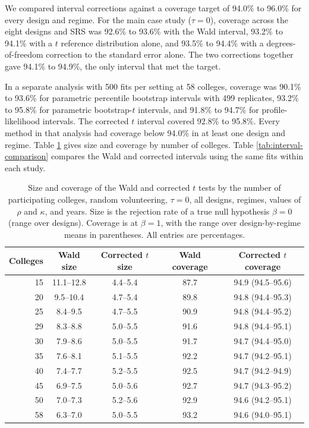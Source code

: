 \documentclass[11pt]{article}
\begin{document}
We compared interval corrections against a coverage target of 94.0\%
to 96.0\% for every design and regime. For the main case study
($\tau=0$), coverage across the eight designs and SRS was 92.6\% to
93.6\% with the Wald interval, 93.2\% to 94.1\% with a $t$ reference
distribution alone, and 93.5\% to 94.4\% with a degrees-of-freedom
correction to the standard error alone. The two corrections together
gave 94.1\% to 94.9\%, the only interval that met the target.

In a separate analysis with 500 fits per setting at 58 colleges, coverage
was 90.1\% to 93.6\% for parametric percentile bootstrap intervals
with 499 replicates, 93.2\% to 95.8\% for parametric bootstrap-$t$
intervals, and 91.8\% to 94.7\% for profile-likelihood intervals. The
corrected $t$ interval covered 92.8\% to 95.8\%. Every method in that
analysis had coverage below 94.0\% in at least one design and regime.
Table \ref{tab:nc-calibration} gives size and coverage by number of
colleges. Table \ref{tab:interval-comparison} compares the Wald and
corrected intervals using the same fits within each study.

\begin{table}[!htb]
\small
\centering
\caption{Size and coverage of the Wald and corrected $t$ tests by the number of participating colleges, random volunteering, $\tau = 0$, all designs, regimes, values of $\rho$ and $\kappa$, and years. Size is the rejection rate of a true null hypothesis $\beta = 0$ (range over designs). Coverage is at $\beta = 1$, with the range over design-by-regime means in parentheses. All entries are percentages.}
\label{tab:nc-calibration}
\begin{tabular}{rcccc}
\toprule
Colleges & Wald size & Corrected $t$ size & Wald coverage & Corrected $t$ coverage \\
\midrule
15 & 11.1--12.8 & 4.4--5.4 & 87.7 & 94.9 (94.5--95.6) \\
20 & 9.5--10.4 & 4.7--5.4 & 89.8 & 94.8 (94.4--95.3) \\
25 & 8.4--9.5 & 4.7--5.5 & 90.9 & 94.8 (94.4--95.2) \\
29 & 8.3--8.8 & 5.0--5.5 & 91.6 & 94.8 (94.4--95.1) \\
30 & 7.9--8.6 & 5.0--5.5 & 91.7 & 94.7 (94.4--95.0) \\
35 & 7.6--8.1 & 5.1--5.5 & 92.2 & 94.7 (94.2--95.1) \\
40 & 7.4--7.7 & 5.2--5.5 & 92.5 & 94.7 (94.2--94.9) \\
45 & 6.9--7.5 & 5.0--5.6 & 92.7 & 94.7 (94.3--95.2) \\
50 & 7.0--7.3 & 5.2--5.6 & 92.9 & 94.6 (94.2--95.1) \\
58 & 6.3--7.0 & 5.0--5.5 & 93.2 & 94.6 (94.0--95.1) \\
\bottomrule
\end{tabular}
\end{table}
\end{document}
